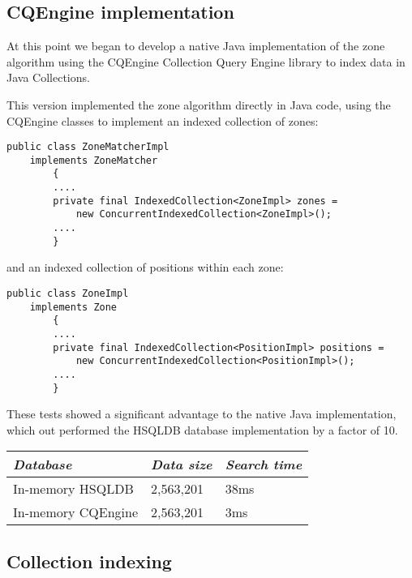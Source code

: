 \documentclass{article}
\newcommand{\hsqldb} {HSQLDB\xspace}
\newcommand{\cqengine} {CQEngine\xspace}
\begin{document}
\subsection{CQEngine implementation}
\label{cqengine-implementation}

At this point we began to develop a native Java implementation of the zone algorithm using the \cqengine Collection Query Engine library to index data in Java Collections.

This version implemented the zone algorithm directly in Java code, using the \cqengine classes to implement an indexed collection of zones:

\begin{lstlisting}[style=Java]
    public class ZoneMatcherImpl
    implements ZoneMatcher
        {
        ....
        private final IndexedCollection<ZoneImpl> zones =
            new ConcurrentIndexedCollection<ZoneImpl>();
        ....
        }
\end{lstlisting}

and an indexed collection of positions within each zone:

\begin{lstlisting}[style=Java]
    public class ZoneImpl
    implements Zone
        {
        ....
        private final IndexedCollection<PositionImpl> positions =
            new ConcurrentIndexedCollection<PositionImpl>();
        ....
        }
\end{lstlisting}

These tests showed a significant advantage to the native Java implementation, which out performed the \hsqldb database implementation by a factor of 10.

\begin{table}[h]
\centering
\begin{tabular}{|l|l|l|}
\hline
\textit{Database} & \textit{Data size} & \textit{Search time} \\ \hline
In-memory \hsqldb & 2,563,201 & 38ms \\ \hline
In-memory \cqengine & 2,563,201 & 3ms \\ \hline
\end{tabular}
\end{table}

\subsection{Collection indexing}
\label{cqengine-indexing}
\end{document}
